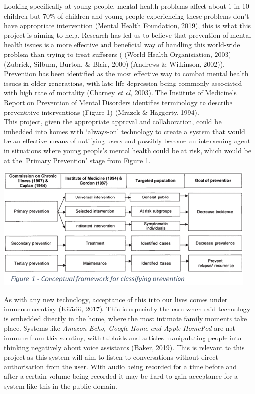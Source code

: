 \documentclass[a4paper,11pt]{report}
\begin{document}
Looking specifically at young people, mental health problems affect about 1 in 10 children but 70\% of children and young people experiencing these problems don’t have appropriate intervention (Mental Health Foundation, 2019), this is what this project is aiming to help. Research has led us to believe that prevention of mental health issues is a more effective and beneficial way of handling this world-wide problem than trying to treat sufferers ( (World Health Organisiation, 2003) (Zubrick, Silburn, Burton, \& Blair, 2000) (Andrews \& Wilkinson, 2002)). Prevention has been identified as the most effective way to combat mental health issues in older generations, with late life depression being commonly associated with high rate of mortality (Charney \textit{et al}, 2003). The Institute of Medicine’s Report on Prevention of Mental Disorders identifies terminology to describe preventitive interventions (Figure 1) (Mrazek \& Haggerty, 1994).\\

This project, given the appropriate approval and collaboration, could be imbedded into homes with ‘always-on’ technology to create a system that would be an effective means of notifying users and possibly become an intervening agent in situations where young people’s mental health could be at risk, which would be at the ‘Primary Prevention’ stage from Figure 1. \\

\begin{center}
\includegraphics{Framework.PNG}
\end{center}

As with any new technology, acceptance of this into our lives comes under immense scrutiny (Kääriä, 2017). This is especially the case when said technology is embedded directly in the home, where the most intimate family moments take place. Systems like \textit{Amazon Echo, Google Home and Apple HomePod} are not immune from this scrutiny, with tabloids and articles manipulating people into thinking negatively about voice assistants (Baker, 2019). This is relevant to this project as this system will aim to listen to conversations without direct authorisation from the user. With audio being recorded for a time before and after a certain volume being recorded it may be hard to gain acceptance for a system like this in the public domain.\\
\end{document}
